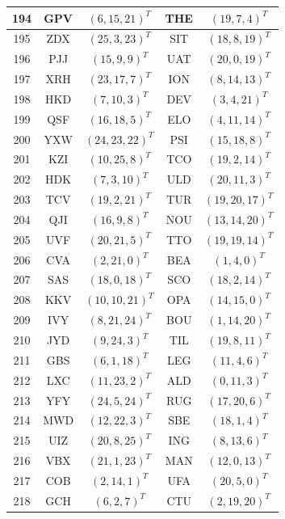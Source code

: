 \begin{longtable}{|c|c|c|c|c|}
  \hline
  194 & GPV & $(6, 15, 21)^T$ & THE & $(19, 7, 4)^T$ \\
  \hline
  195 & ZDX & $(25, 3, 23)^T$ & SIT & $(18, 8, 19)^T$ \\
  \hline
  196 & PJJ & $(15, 9, 9)^T$ & UAT & $(20, 0, 19)^T$ \\
  \hline
  197 & XRH & $(23, 17, 7)^T$ & ION & $(8, 14, 13)^T$ \\
  \hline
  198 & HKD & $(7, 10, 3)^T$ & DEV & $(3, 4, 21)^T$ \\
  \hline
  199 & QSF & $(16, 18, 5)^T$ & ELO & $(4, 11, 14)^T$ \\
  \hline
  200 & YXW & $(24, 23, 22)^T$ & PSI & $(15, 18, 8)^T$ \\
  \hline
  201 & KZI & $(10, 25, 8)^T$ & TCO & $(19, 2, 14)^T$ \\
  \hline
  202 & HDK & $(7, 3, 10)^T$ & ULD & $(20, 11, 3)^T$ \\
  \hline
  203 & TCV & $(19, 2, 21)^T$ & TUR & $(19, 20, 17)^T$ \\
  \hline
  204 & QJI & $(16, 9, 8)^T$ & NOU & $(13, 14, 20)^T$ \\
  \hline
  205 & UVF & $(20, 21, 5)^T$ & TTO & $(19, 19, 14)^T$ \\
  \hline
  206 & CVA & $(2, 21, 0)^T$ & BEA & $(1, 4, 0)^T$ \\
  \hline
  207 & SAS & $(18, 0, 18)^T$ & SCO & $(18, 2, 14)^T$ \\
  \hline
  208 & KKV & $(10, 10, 21)^T$ & OPA & $(14, 15, 0)^T$ \\
  \hline
  209 & IVY & $(8, 21, 24)^T$ & BOU & $(1, 14, 20)^T$ \\
  \hline
  210 & JYD & $(9, 24, 3)^T$ & TIL & $(19, 8, 11)^T$ \\
  \hline
  211 & GBS & $(6, 1, 18)^T$ & LEG & $(11, 4, 6)^T$ \\
  \hline
  212 & LXC & $(11, 23, 2)^T$ & ALD & $(0, 11, 3)^T$ \\
  \hline
  213 & YFY & $(24, 5, 24)^T$ & RUG & $(17, 20, 6)^T$ \\
  \hline
  214 & MWD & $(12, 22, 3)^T$ & SBE & $(18, 1, 4)^T$ \\
  \hline
  215 & UIZ & $(20, 8, 25)^T$ & ING & $(8, 13, 6)^T$ \\
  \hline
  216 & VBX & $(21, 1, 23)^T$ & MAN & $(12, 0, 13)^T$ \\
  \hline
  217 & COB & $(2, 14, 1)^T$ & UFA & $(20, 5, 0)^T$ \\
  \hline
  218 & GCH & $(6, 2, 7)^T$ & CTU & $(2, 19, 20)^T$ \\

\end{longtable}
